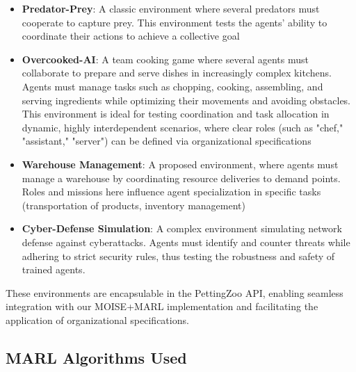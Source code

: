 \documentclass[sigconf,anonymous]{aamas}
\begin{document}
\begin{itemize}
    \item \textbf{Predator-Prey}: A classic environment where several predators must cooperate to capture prey. This environment tests the agents' ability to coordinate their actions to achieve a collective goal\cite{lowe2017multi}

    \item \textbf{Overcooked-AI}: A team cooking game where several agents must collaborate to prepare and serve dishes in increasingly complex kitchens\cite{overcookedai}. Agents must manage tasks such as chopping, cooking, assembling, and serving ingredients while optimizing their movements and avoiding obstacles. This environment is ideal for testing coordination and task allocation in dynamic, highly interdependent scenarios, where clear roles (such as "chef," "assistant," "server") can be defined via organizational specifications
    
    \item \textbf{Warehouse Management}: A proposed environment, where agents must manage a warehouse by coordinating resource deliveries to demand points. Roles and missions here influence agent specialization in specific tasks (transportation of products, inventory management)
    
    \item \textbf{Cyber-Defense Simulation}: A complex environment simulating network defense against cyberattacks. Agents must identify and counter threats while adhering to strict security rules, thus testing the robustness and safety of trained agents\cite{Maxwell2021}.
\end{itemize}

These environments are encapsulable in the PettingZoo API, enabling seamless integration with our MOISE+MARL implementation and facilitating the application of organizational specifications.

\subsection{MARL Algorithms Used}
\end{document}

